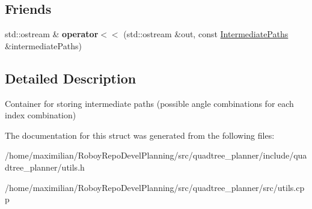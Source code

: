 \subsection*{Friends}
\begin{DoxyCompactItemize}
\item 
\mbox{\label{structquadtree__planner_1_1IntermediatePaths_aad252649919945cbcff2c68113b7f442}} 
std\+::ostream \& {\bfseries operator$<$$<$} (std\+::ostream \&out, const \hyperlink{structquadtree__planner_1_1IntermediatePaths}{Intermediate\+Paths} \&intermediate\+Paths)
\end{DoxyCompactItemize}


\subsection{Detailed Description}
Container for storing intermediate paths (possible angle combinations for each index combination) 

The documentation for this struct was generated from the following files\+:\begin{DoxyCompactItemize}
\item 
/home/maximilian/\+Roboy\+Repo\+Devel\+Planning/src/quadtree\+\_\+planner/include/quadtree\+\_\+planner/utils.\+h\item 
/home/maximilian/\+Roboy\+Repo\+Devel\+Planning/src/quadtree\+\_\+planner/src/utils.\+cpp\end{DoxyCompactItemize}

